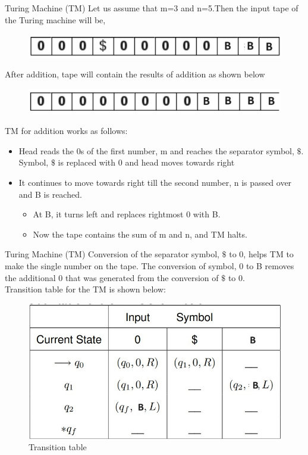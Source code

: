\documentclass{beamer}
\begin{document}
\begin{frame}{Turing Machine (TM)}
	Let us assume that m=3 and n=5.Then the input tape of the Turing machine will be,
\begin{figure}
	\includegraphics[scale=.45]{img5/m7}
\end{figure}
After addition, tape will contain the results of addition as shown below
\begin{figure}
	\includegraphics[scale=.45]{img5/m8}
\end{figure}
TM for addition works as follows:
\begin{itemize}
	\item Head reads the 0s of the first number, m and reaches the separator symbol, $\$ $. Symbol, $\$ $ is replaced with 0 and head
	moves towards right
	\item It continues to move towards right till the second number, n is passed over and B is reached.
	\begin{itemize}
		\item At B, it turns left and replaces rightmost 0 with B.
		\item Now the tape contains the sum of m and n, and TM halts.
	\end{itemize}
\end{itemize}
\end{frame}	
\begin{frame}{Turing Machine (TM)} 
Conversion of the separator symbol, $\$ $ to 0, helps TM to make the single number on the tape. The conversion of symbol,
0 to B removes the additional 0 that was generated from the conversion of $\$$ to 0.\\
Transition table for the TM is shown below:
\begin{figure}
	\includegraphics[scale=.45]{img5/m9}
		\caption{Transition table}
\end{figure}
\end{frame}	
\end{document}
